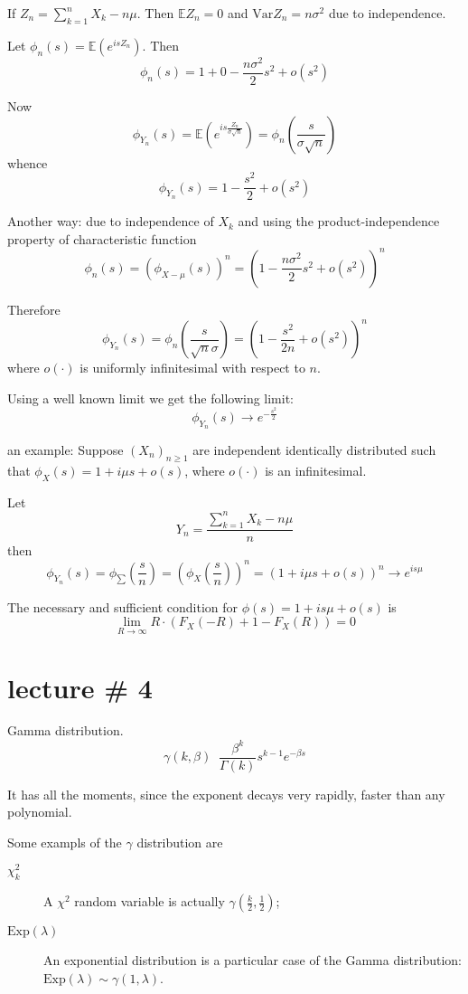 \documentclass[a4paper]{article}
\newcommand{\brac}[1]{{\left ( #1 \right )}}
\newcommand{\Ex}{\mathbb{E}}
\newcommand{\Var}{\text{Var}}
\newcommand{\defn}{\mathop{\overset{\Delta}{=}}\nolimits}
\begin{document}
If $Z_n = \sum_{k=1}^n X_k - n\mu$. Then $\Ex Z_n = 0$ and $\Var Z_n = n \sigma^2$ due to independence.

Let $\phi_n(s) = \Ex\brac{e^{isZ_n}}$. Then
\[\phi_n(s) = 1 + 0 - \frac{n\sigma^2}{2} s^2 + o(s^2)\]

Now
\[\phi_{Y_n}(s) = \Ex\brac{e^{is\frac{Z_n}{\sigma \sqrt{n}}}} = \phi_n(\frac{s}{\sigma\sqrt{n}})\]
whence
\[\phi_{Y_n}(s) = 1 - \frac{s^2}{2} + o(s^2)\]


Another way: due to independence of $X_k$ and using the product-independence property of characteristic function
\[\phi_n(s) = \brac{\phi_{X-\mu}(s)}^n = \brac{ 1 - \frac{n\sigma^2}{2} s^2 + o(s^2) }^n\]

Therefore
\[\phi_{Y_n}(s) = \phi_n(\frac{s}{\sqrt{n}\sigma}) = \brac{ 1 - \frac{s^2}{2n} + o(s^2) }^n\]
 where $o(\cdot)$ is uniformly infinitesimal with respect to $n$.

Using a well known limit we get the following limit:
\[\phi_{Y_n}(s) \to e^{-\frac{s^2}{2}}\]

an example:
Suppose $\brac{X_n}_{n\geq1}$ are independent identically distributed such that $\phi_X(s) = 1+i\mu s + o(s)$, where $o(\cdot)$ is an infinitesimal.

Let \[Y_n = \frac{\sum_{k=1}^n X_k - n \mu }{n}\]
then
\[\phi_{Y_n}(s) = \phi_{\sum}(\frac{s}{n})
= \brac{\phi_X(\frac{s}{n})}^n = \brac{1+i\mu s + o(s)}^n
\to e^{is\mu}\]

The necessary and sufficient condition for $\phi(s) = 1+i s\mu+o(s)$ is \[\lim_{R\to\infty} R\cdot \brac{F_X(-R) + 1 - F_X(R)} = 0\]



\section{lecture \# 4} %
\label{sec:lecture_4}

Gamma distribution.
\[\gamma(k,\beta) \defn \frac{\beta^k}{\Gamma(k)} s^{k-1} e^{-\beta s}\]

It has all the moments, since the exponent decays very rapidly, faster than any polynomial.

Some exampls of the $\gamma$ distribution are \begin{description}
	\item[$\chi^2_k$] A $\chi^2$ random variable is actually $\gamma\brac{\frac{k}{2},\frac{1}{2}}$;
	\item[$\text{Exp}(\lambda)$] An exponential distribution is a particular case of the Gamma distribution: $\text{Exp}(\lambda) \sim \gamma(1,\lambda)$.
\end{description}
\end{document}
